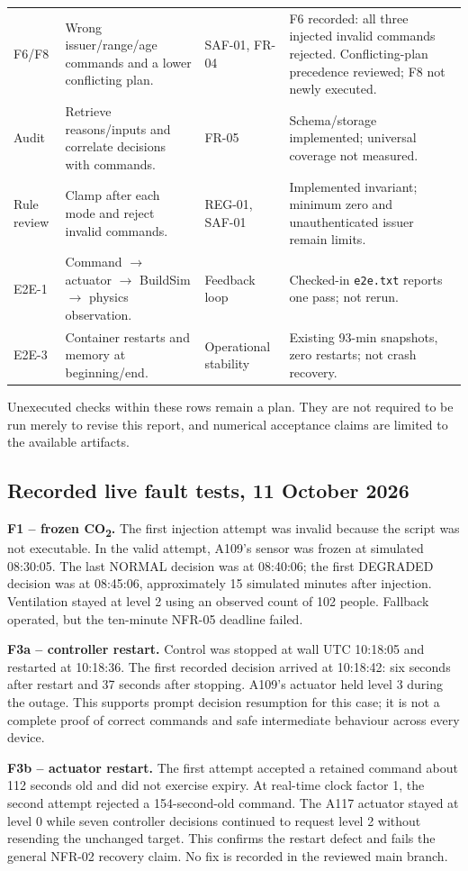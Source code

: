 \documentclass[11pt,a4paper]{article}
\begin{document}
{\begin{longtable}{p{19mm}p{63mm}p{24mm}p{37mm}}
F6/F8 & Wrong issuer/range/age commands and a lower conflicting plan. & SAF-01, FR-04 & F6 recorded: all three injected invalid commands rejected. Conflicting-plan precedence reviewed; F8 not newly executed.\\
Audit & Retrieve reasons/inputs and correlate decisions with commands. & FR-05 & Schema/storage implemented; universal coverage not measured.\\
Rule review & Clamp after each mode and reject invalid commands. & REG-01, SAF-01 & Implemented invariant; minimum zero and unauthenticated issuer remain limits.\\
E2E-1 & Command $\rightarrow$ actuator $\rightarrow$ BuildSim $\rightarrow$ physics observation. & Feedback loop & Checked-in \texttt{e2e.txt} reports one pass; not rerun.\\
E2E-3 & Container restarts and memory at beginning/end. & Operational stability & Existing 93-min snapshots, zero restarts; not crash recovery.\\\bottomrule\end{longtable}}
Unexecuted checks within these rows remain a plan. They are not required to be run merely to revise this report, and numerical acceptance claims are limited to the available artifacts.

\subsection*{Recorded live fault tests, 11 October 2026}
\textbf{F1 -- frozen CO\textsubscript{2}.} The first injection attempt was invalid because the script was not executable. In the valid attempt, A109's sensor was frozen at simulated 08:30:05. The last NORMAL decision was at 08:40:06; the first DEGRADED decision was at 08:45:06, approximately 15 simulated minutes after injection. Ventilation stayed at level 2 using an observed count of 102 people. Fallback operated, but the ten-minute NFR-05 deadline failed.

\textbf{F3a -- controller restart.} Control was stopped at wall UTC 10:18:05 and restarted at 10:18:36. The first recorded decision arrived at 10:18:42: six seconds after restart and 37 seconds after stopping. A109's actuator held level 3 during the outage. This supports prompt decision resumption for this case; it is not a complete proof of correct commands and safe intermediate behaviour across every device.

\textbf{F3b -- actuator restart.} The first attempt accepted a retained command about 112 seconds old and did not exercise expiry. At real-time clock factor 1, the second attempt rejected a 154-second-old command. The A117 actuator stayed at level 0 while seven controller decisions continued to request level 2 without resending the unchanged target. This confirms the restart defect and fails the general NFR-02 recovery claim. No fix is recorded in the reviewed main branch.
\end{document}
